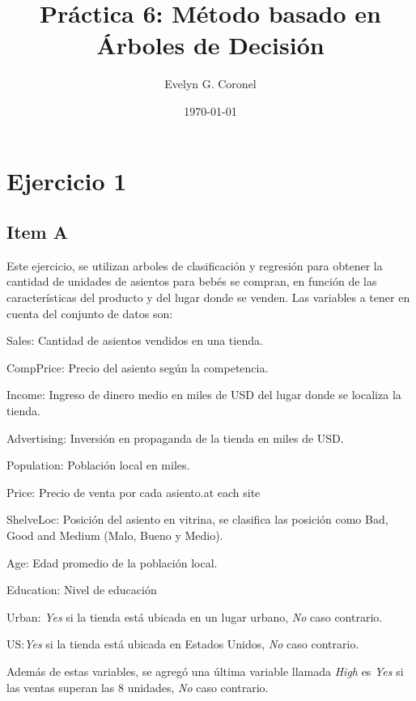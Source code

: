 
\usepackage{multirow}
\usepackage{paralist}


\title{Práctica 6: Método basado en Árboles de Decisión}
\author{Evelyn G. Coronel}


\date[]{\lowercase{\today}} 

\maketitle

\section*{Ejercicio 1}


\subsection*{Item A}
Este ejercicio, se utilizan arboles de clasificación y regresión para obtener la cantidad de unidades de asientos para bebés se compran, en función de las características del producto y del lugar donde se venden. Las variables a tener en cuenta del conjunto de datos son:

\begin{compactenum}
	\item Sales: Cantidad de asientos vendidos en una tienda.
	\item CompPrice: Precio del asiento según la competencia.
	\item Income: Ingreso de dinero medio en miles de USD del lugar donde se localiza la tienda.
	\item Advertising: Inversión en propaganda de la tienda en  miles de USD.
	\item Population: Población local en miles.
	\item Price: Precio de venta por cada asiento.at each site
	\item ShelveLoc: Posición del asiento en vitrina, se clasifica las posición como Bad, Good and Medium  (Malo, Bueno y Medio).
	\item Age: Edad promedio de la población local.
	\item Education: Nivel de educación
	\item Urban: \emph{Yes} si la tienda está ubicada en un lugar urbano, \emph{No} caso contrario.
	\item US:\emph{Yes} si la tienda está ubicada en Estados Unidos, \emph{No} caso contrario.    
\end{compactenum}
Además de estas variables, se agregó una última variable llamada \emph{High} es \emph{Yes} si las ventas superan las $8$ unidades, \emph{No} caso contrario. 

